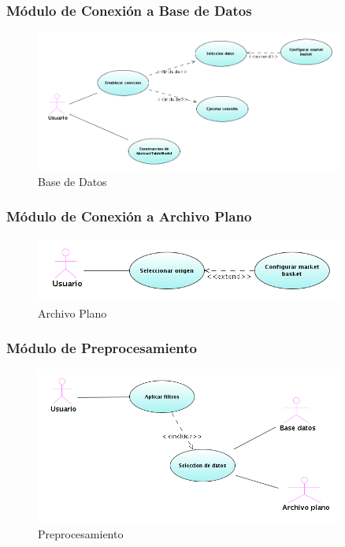 \subsubsection{M\'odulo de Conexi\'on a Base de Datos}
\begin{figure}[h]
 \centering
 \includegraphics[width=0.9\textwidth]{imgsCasosUso/04conexionBD.png}
 \caption{Base de Datos}
\end{figure}
\newpage

\subsubsection{M\'odulo de Conexi\'on a Archivo Plano}
\begin{figure}[h]
 \centering
 \includegraphics[width=0.9\textwidth]{imgsCasosUso/03archivoPlano.png}
 \caption{Archivo Plano}
\end{figure}

\subsubsection{M\'odulo de Preprocesamiento}
\begin{figure}[h]
 \centering
 \includegraphics[width=0.9\textwidth]{imgsCasosUso/05preprocesamiento.png}
 \caption{Preprocesamiento}
\end{figure}
\newpage

